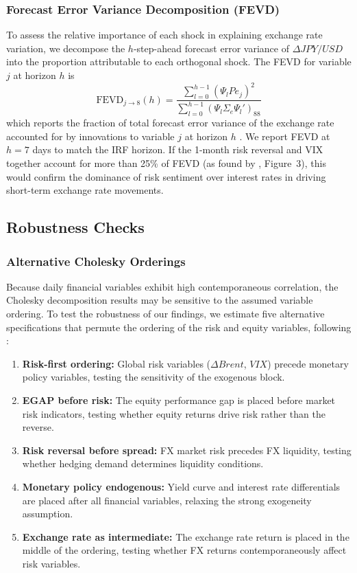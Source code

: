 \documentclass[12pt]{article}
\begin{document}
\subsubsection{Forecast Error Variance Decomposition (FEVD)}

{} To assess the relative importance of each shock in explaining exchange rate variation, we decompose the $h$-step-ahead forecast error variance of $\Delta JPY/USD$ into the proportion attributable to each orthogonal shock. The FEVD for variable $j$ at horizon $h$ is
\begin{equation}
\text{FEVD}_{j \rightarrow 8}(h) = \frac{\sum_{l=0}^{h-1} (\Psi_l P e_j)^2}{\sum_{l=0}^{h-1} (\Psi_l \Sigma_e \Psi_l')_{88}}
\end{equation}
which reports the fraction of total forecast error variance of the exchange rate accounted for by innovations to variable $j$ at horizon $h$ \parencite{luetkepohl2005new}. We report FEVD at $h = 7$ days to match the IRF horizon. If the 1-month risk reversal and VIX together account for more than 25\% of FEVD (as found by \textcite{guyot2026risk}, Figure~3), this would confirm the dominance of risk sentiment over interest rates in driving short-term exchange rate movements.

\subsection{Robustness Checks}

\subsubsection{Alternative Cholesky Orderings}

{} Because daily financial variables exhibit high contemporaneous correlation, the Cholesky decomposition results may be sensitive to the assumed variable ordering. To test the robustness of our findings, we estimate five alternative specifications that permute the ordering of the risk and equity variables, following \textcite[pp.~29--30]{guyot2026risk}:

\begin{enumerate}
  \item \textbf{Risk-first ordering:} Global risk variables ($\Delta Brent$, $VIX$) precede monetary policy variables, testing the sensitivity of the exogenous block.
  \item \textbf{EGAP before risk:} The equity performance gap is placed before market risk indicators, testing whether equity returns drive risk rather than the reverse.
  \item \textbf{Risk reversal before spread:} FX market risk precedes FX liquidity, testing whether hedging demand determines liquidity conditions.
  \item \textbf{Monetary policy endogenous:} Yield curve and interest rate differentials are placed after all financial variables, relaxing the strong exogeneity assumption.
  \item \textbf{Exchange rate as intermediate:} The exchange rate return is placed in the middle of the ordering, testing whether FX returns contemporaneously affect risk variables.
\end{enumerate}
\end{document}
